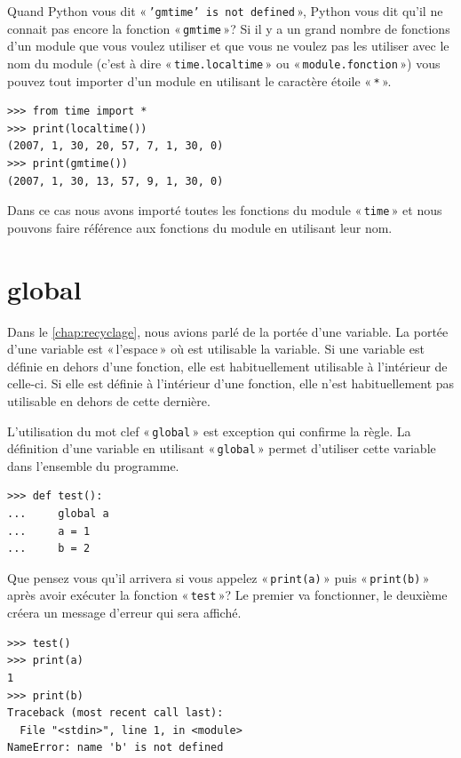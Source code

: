 Quand Python vous dit « \texttt{'gmtime' is not defined} », Python vous dit qu'il ne connait pas encore la fonction « \texttt{gmtime} »? Si il y a un grand nombre de fonctions d'un module que vous voulez utiliser et que vous ne voulez pas les utiliser avec le nom du module (c'est à dire « \texttt{time.localtime} » ou « \texttt{module.fonction} ») vous pouvez tout importer d'un module en utilisant le caractère étoile « \texttt{*} ».   


\begin{Verbatim}[frame=single,rulecolor=\color{gray}]
>>> from time import *
>>> print(localtime())
(2007, 1, 30, 20, 57, 7, 1, 30, 0)
>>> print(gmtime())
(2007, 1, 30, 13, 57, 9, 1, 30, 0)
\end{Verbatim}


Dans ce cas nous avons importé toutes les fonctions du module « \texttt{time} » et nous pouvons faire référence aux fonctions du module en utilisant leur nom.

\section*{global}

Dans le \autoref{chap:recyclage}, nous avions parlé de la portée d'une variable. La portée d'une variable est « l'espace » où est utilisable la variable. Si une variable est définie en dehors d'une fonction, elle est habituellement utilisable à l'intérieur de celle-ci. Si elle est définie à l'intérieur d'une fonction, elle n'est habituellement pas utilisable en dehors de cette dernière. 

L'utilisation du mot clef « \texttt{global} » est exception qui confirme la règle. La définition d'une variable en utilisant « \texttt{global} » permet d'utiliser cette variable dans l'ensemble du programme.

\begin{listing}
\begin{verbatim}
>>> def test():
...     global a
...     a = 1
...     b = 2
\end{verbatim}
\end{listing}

Que pensez vous qu'il arrivera si vous appelez « \texttt{print(a)} » puis « \texttt{print(b)} » après avoir exécuter la fonction « \texttt{test} »? Le premier va fonctionner, le deuxième créera un message d'erreur qui sera affiché.

\begin{Verbatim}[frame=single,rulecolor=\color{gray}]
>>> test()
>>> print(a)
1
>>> print(b)
Traceback (most recent call last):
  File "<stdin>", line 1, in <module>
NameError: name 'b' is not defined
\end{Verbatim}


